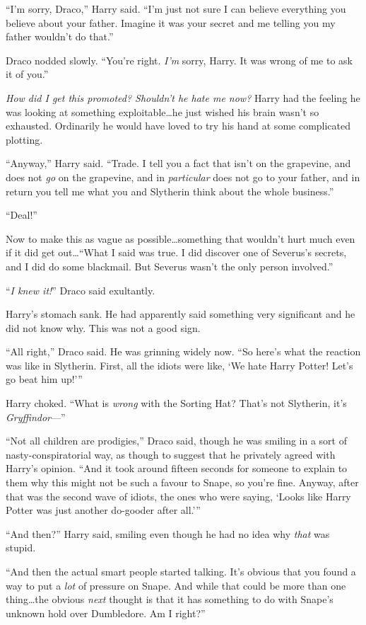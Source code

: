 “I’m sorry, Draco,” Harry said. “I’m just not sure I can believe everything you believe about your father. Imagine it was your secret and me telling you my father wouldn’t do that.”

Draco nodded slowly. “You’re right. \emph{I’m} sorry, Harry. It was wrong of me to ask it of you.”

\emph{How did I get \emph{this} promoted? Shouldn’t he hate me now?} Harry had the feeling he was looking at something exploitable…he just wished his brain wasn’t so exhausted. Ordinarily he would have loved to try his hand at some complicated plotting.

“Anyway,” Harry said. “Trade. I tell you a fact that isn’t on the grapevine, and does not \emph{go} on the grapevine, and in \emph{particular} does not go to your father, and in return you tell me what you and Slytherin think about the whole business.”

“Deal!”

Now to make this as vague as possible…something that wouldn’t hurt much even if it did get out…“What I said was true. I did discover one of Severus’s secrets, and I did do some blackmail. But Severus wasn’t the only person involved.”

“\emph{I knew it!}” Draco said exultantly.

Harry’s stomach sank. He had apparently said something very significant and he did not know why. This was not a good sign.

“All right,” Draco said. He was grinning widely now. “So here’s what the reaction was like in Slytherin. First, all the idiots were like, ‘We hate Harry Potter! Let’s go beat him up!’”

Harry choked. “What is \emph{wrong} with the Sorting Hat? That’s not Slytherin, it’s \emph{Gryffindor}—”

“Not all children are prodigies,” Draco said, though he was smiling in a sort of nasty-conspiratorial way, as though to suggest that he privately agreed with Harry’s opinion. “And it took around fifteen seconds for someone to explain to them why this might not be such a favour to Snape, so you’re fine. Anyway, after that was the second wave of idiots, the ones who were saying, ‘Looks like Harry Potter was just another do-gooder after all.’”

“And then?” Harry said, smiling even though he had no idea why \emph{that} was stupid.

“And then the actual smart people started talking. It’s obvious that you found a way to put a \emph{lot} of pressure on Snape. And while that could be more than one thing…the obvious \emph{next} thought is that it has something to do with Snape’s unknown hold over Dumbledore. Am I right?”

